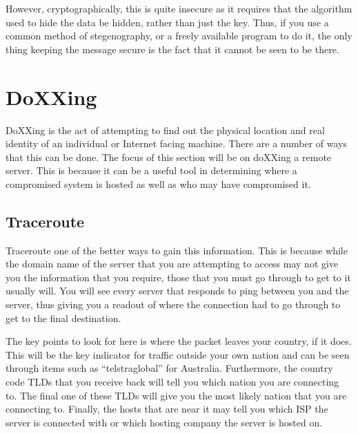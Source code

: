 		However, cryptographically, this is quite insecure as it requires that the algorithm used to hide the data be hidden, rather than just the key.
		Thus, if you use a common method of stegenography, or a freely available program to do it, the only thing keeping the message secure is the fact that it cannot be seen to be there.
	\section{DoXXing}
		DoXXing is the act of attempting to find out the physical location and real identity of an individual or Internet facing machine.
		There are a number of ways that this can be done.
		The focus of this section will be on doXXing a remote server.
		This is because it can be a useful tool in determining where a compromised system is hosted as well as who may have compromised it.
		\subsection{Traceroute}
			Traceroute one of the better ways to gain this information.
			This is because while the domain name of the server that you are attempting to access may not give you the information that you require, those that you must go through to get to it usually will.
			You will see every server that responds to ping between you and the server, thus giving you a readout of where the connection had to go through to get to the final destination.

			The key points to look for here is where the packet leaves your country, if it does.
			This will be the key indicator for traffic outside your own nation and can be seen through items such as ``telstraglobal'' for Australia.
			Furthermore, the country code TLDs that you receive back will tell you which nation you are connecting to.
			The final one of these TLDs will give you the most likely nation that you are connecting to.
			Finally, the hosts that are near it may tell you which ISP the server is connected with or which hosting company the server is hosted on.

